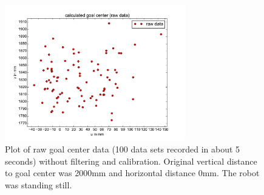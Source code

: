 \documentclass[lnicst,a4paper]{svmultln}
\begin{document}
\begin{figure}
 	\centerline{\includegraphics[width=0.7\textwidth]{noise_data_plot.pdf}}
	{\caption{Plot of raw goal center data (100 data sets recorded in about 5 seconds) without filtering and calibration. Original vertical distance to goal center was 2000mm and horizontal distance 0mm. The robot was standing still.}
	\label{fig:noise1}}
\end{figure}
\end{document}
